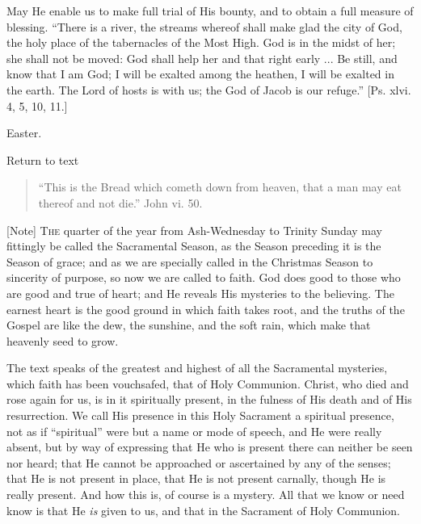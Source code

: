 May He enable us to make full trial of His bounty, and to obtain a
full measure of blessing. ``There is a river, the streams whereof
shall make glad the city of God, the holy place of the tabernacles of
the Most High. God is in the midst of her; she shall not be moved: God
shall help her and that right early ... Be still, and know that I am
God; I will be exalted among the heathen, I will be exalted in the
earth. The Lord of hosts is with us; the God of Jacob is our
refuge.'' [Ps. xlvi. 4, 5, 10, 11.]


Easter.

Return to text


\begin{quote}

``This is the Bread which cometh down from heaven, that a man
may eat thereof and not die.'' John vi. 50.

\end{quote}

[Note] T\textsc{he} quarter of the year
from Ash-Wednesday to Trinity Sunday may fittingly be called the
Sacramental Season, as the Season preceding it is the Season of grace;
and as we are specially called in the Christmas Season to sincerity of
purpose, so now we are called to faith. God does good to those who are
good and true of heart; and He reveals His mysteries to the believing.
The earnest heart is the good ground in which faith takes root, and
the truths of the Gospel are like the dew, the sunshine, and the soft
rain, which make that heavenly seed to grow.

The text speaks of the greatest and highest of all the Sacramental
mysteries, which faith has been vouchsafed, that of Holy Communion.
Christ, who died and rose again for us, is in it spiritually present,
in the fulness of His death and of His resurrection. We call His
presence in this Holy Sacrament a spiritual presence, not as if
``spiritual'' were but a name or mode of speech, and He were
really absent, but by way of expressing that He who is present there
can neither be seen nor heard; that He cannot be approached or
ascertained by any of the senses; that He is not present in place,
that He is not present carnally, though He is really present. And how
this is, of course is a mystery. All that we know or need know is that
He \emph{is} given to us, and that in the Sacrament of Holy Communion.

